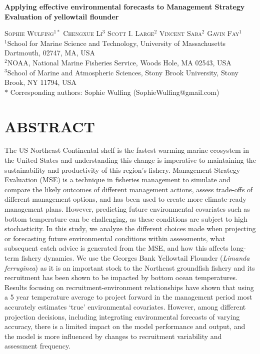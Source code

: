 \documentclass[
  12pt,
]{article}
\author{}
\date{\vspace{-2.5em}}
\begin{document}
\doublespacing

\begin{center}
    
\textbf{\Large Applying effective environmental forecasts to Management Strategy Evaluation of yellowtail flounder}
    
\textsc{Sophie Wulfing$^{1*}$ Chengxue Li$^{3}$ Scott I. Large$^{2}$ Vincent Saba$^{2}$ Gavin Fay$^{1}$\\}
\vspace{3 mm}
\normalsize{\indent $^1$School for Marine Science and Technology, University of Massachusetts Dartmouth, 02747, MA, USA\\ $^2$NOAA, National Marine Fisheries Service, Woods Hole, MA 02543, USA\\ $^3$School of Marine and Atmospheric Sciences, Stony Brook University, Stony Brook, NY 11794, USA\\}
$\text{*}$ Corresponding authors: Sophie Wulfing (SophieWulfing@gmail.com)
\end{center}

\newpage

\linenumbers

\section{ABSTRACT}\label{abstract}

The US Northeast Continental shelf is the fastest warming marine ecosystem in the United States and understanding this change is imperative to maintaining the sustainability and productivity of this region's fishery. Management Strategy Evaluation (MSE) is a technique in fisheries management to simulate and compare the likely outcomes of different management actions, assess trade-offs of different management options, and has been used to create more climate-ready management plans. However, predicting future environmental covariates such as bottom temperature can be challenging, as these conditions are subject to high stochasticity. In this study, we analyze the different choices made when projecting or forecasting future environmental conditions within assessments, what subsequent catch advice is generated from the MSE, and how this affects long-term fishery dynamics. We use the Georges Bank Yellowtail Flounder (\emph{Limanda ferruginea}) as it is an important stock to the Northeast groundfish fishery and its recruitment has been shown to be impacted by bottom ocean temperatures. Results focusing on recruitment-environment relationships have shown that using a 5 year temperature average to project forward in the management period most accurately estimates `true' environmental covariates. However, among different projection decisions, including integrating environmental forecasts of varying accuracy, there is a limited impact on the model performance and output, and the model is more influenced by changes to recruitment variability and assessment frequency.
\end{document}
